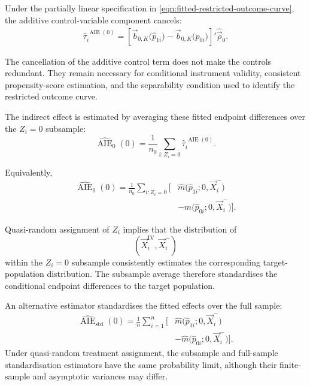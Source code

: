 Under the partially linear specification in
\eqref{eqn:fitted-restricted-outcome-curve}, the additive control-variable component cancels:
\[
    \begin{aligned}
    \widehat\tau_i^{\,\operatorname{AIE}(0)}
    =
    \left[
        \vec b_{0,K}
        \big(
            \widehat p_{1i}
        \big)
        -
        \vec b_{0,K}
        \big(
            \widehat p_{0i}
        \big)
    \right]'
    \widehat{\vec\rho}_0.
    \end{aligned}
    \label{eqn:conditional-aie-series-estimator}
\]

The cancellation of the additive control term does not make the controls redundant.
They remain necessary for conditional instrument validity, consistent propensity-score estimation, and the separability condition used to identify the restricted outcome curve.

The indirect effect is estimated by averaging these fitted endpoint differences over the $Z_i=0$ subsample:
\[
    \boxed{
    \widehat{\operatorname{AIE}}_0(0)
    =
    \frac{1}{n_0}
    \sum_{i:Z_i=0}
        \widehat\tau_i^{\,\operatorname{AIE}(0)}
    }.
    \label{eqn:aie0-subsample-estimator}
\]

Equivalently,
\[
    \begin{aligned}
    \widehat{\operatorname{AIE}}_0(0)
    =
    \frac{1}{n_0}
    \sum_{i:Z_i=0}
    \Big[
        &
        \widehat m
        \big(
            \widehat p_{1i};
            0,
            \vec X_i^-
        \big)
        \\
        &-
        \widehat m
        \big(
            \widehat p_{0i};
            0,
            \vec X_i^-
        \big)
    \Big].
    \end{aligned}
\]

Quasi-random assignment of $Z_i$ implies that the distribution of
\[
    \left(
        \vec X_i^{\mathrm{IV}},
        \vec X_i^-
    \right)
\]
within the $Z_i=0$ subsample consistently estimates the corresponding target-population distribution.
The subsample average therefore standardises the conditional endpoint differences to the target population.

An alternative estimator standardises the fitted effects over the full sample:
\[
    \begin{aligned}
    \widehat{\operatorname{AIE}}_{\mathrm{std}}(0)
    =
    \frac{1}{n}
    \sum_{i=1}^{n}
    \Big[
        &
        \widehat m
        \big(
            \widehat p_{1i};
            0,
            \vec X_i^-
        \big)
        \\
        &-
        \widehat m
        \big(
            \widehat p_{0i};
            0,
            \vec X_i^-
        \big)
    \Big].
    \end{aligned}
    \label{eqn:aie0-full-standardisation}
\]
Under quasi-random treatment assignment, the subsample and full-sample standardisation estimators have the same probability limit, although their finite-sample and asymptotic variances may differ.

